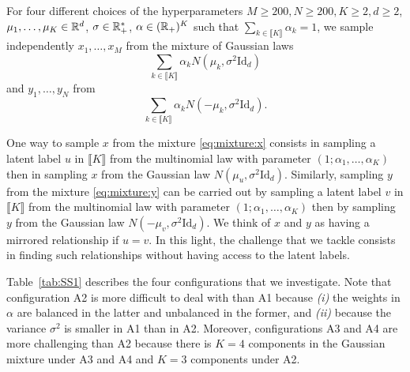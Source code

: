 For      four      different      choices     of      the      hyperparameters
$M    \geq    200,    N    \geq    200,    K    \geq    2,    d    \geq    2$,
$\mu_{1},   \ldots,  \mu_{K}   \in  \mathbb{R}^{d}$,   $\sigma  \in   \mathbb{R}_{+}^{*}$,
$\alpha           \in            (\mathbb{R}_{+})^{K}$           such           that
$\sum_{k\in \llbracket K \rrbracket} \alpha_{k}  = 1$, we sample independently
$x_{1}, \ldots, x_{M}$ from the mixture of Gaussian laws
\begin{equation}
  \label{eq:mixture:x}
  \sum_{k\in \llbracket K\rrbracket} \alpha_k N(\mu_k, \sigma^{2} \text{Id}_{d})
\end{equation}
and $y_{1}, \ldots, y_{N}$ from
\begin{equation}
  \label{eq:mixture:y}
  \sum_{k\in\llbracket K\rrbracket} \alpha_k N(-\mu_k, \sigma^{2} \text{Id}_{d}).
\end{equation}

One  way to  sample  $x$  from the  mixture  \eqref{eq:mixture:x} consists  in
sampling a latent  label $u$ in $\llbracket K\rrbracket$  from the multinomial
law with parameter $(1; \alpha_{1},  \ldots, \alpha_{K})$ then in sampling $x$
from  the Gaussian  law  $N(\mu_{u},  \sigma^{2} \text{Id}_{d})$.   Similarly,
sampling  $y$ from  the mixture  \eqref{eq:mixture:y}  can be  carried out  by
sampling a latent  label $v$ in $\llbracket K\rrbracket$  from the multinomial
law with parameter $(1; \alpha_{1},  \ldots, \alpha_{K})$ then by sampling $y$
from the  Gaussian law $N(-\mu_{v},  \sigma^{2} \text{Id}_{d})$.  We  think of
$x$ and $y$  as having a mirrored  relationship if $u=v$.  In  this light, the
challenge that we tackle consists in finding such relationships without having
access to the latent labels.

Table~\ref{tab:SS1}    describes    the    four   configurations    that    we
investigate. Note that configuration A2 is more difficult to deal with than A1
because \textit{(i)}  the weights in $\alpha$  are balanced in the  latter and
unbalanced in the former, and  \textit{(ii)} because the variance $\sigma^{2}$
is smaller  in A1  than in A2.   Moreover, configurations A3  and A4  are more
challenging than A2 because there is  $K=4$ components in the Gaussian mixture
under A3 and A4 and $K=3$ components under A2.

